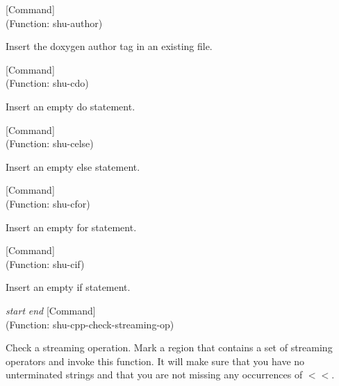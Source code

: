 \vspace{1em}
\noindent
{}
\usebox{\funcname}
 \hfill [Command]\\%
 (Function: shu-author)

\begin{doc-string}
Insert the doxygen author tag in an existing file.
\end{doc-string}

\vspace{1em}
\noindent
{}
\usebox{\funcname}
 \hfill [Command]\\%
 (Function: shu-cdo)

\begin{doc-string}
Insert an empty do statement.
\end{doc-string}

\vspace{1em}
\noindent
{}
\usebox{\funcname}
 \hfill [Command]\\%
 (Function: shu-celse)

\begin{doc-string}
Insert an empty else statement.
\end{doc-string}

\vspace{1em}
\noindent
{}
\usebox{\funcname}
 \hfill [Command]\\%
 (Function: shu-cfor)

\begin{doc-string}
Insert an empty for statement.
\end{doc-string}

\vspace{1em}
\noindent
{}
\usebox{\funcname}
 \hfill [Command]\\%
 (Function: shu-cif)

\begin{doc-string}
Insert an empty if statement.
\end{doc-string}

\vspace{1em}
\noindent
{}
\usebox{\funcname}\emph{start} \emph{end}
 \hfill [Command]\\%
 (Function: shu-cpp-check-streaming-op)

\begin{doc-string}
Check a streaming operation.   Mark a region that contains a set of streaming
operators and invoke this function.  It will make sure that you have no unterminated
strings and that you are not missing any occurrences of $<$$<$.
\end{doc-string}

